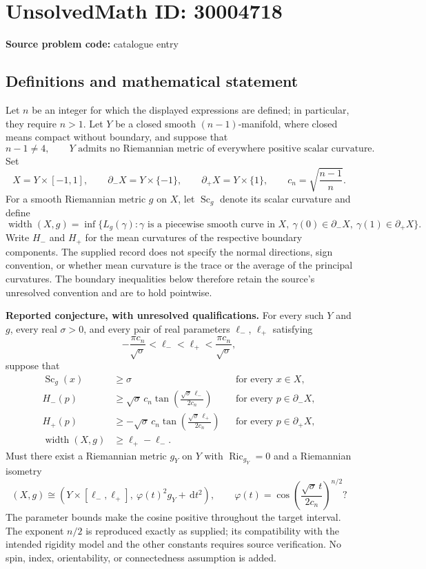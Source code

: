 \documentclass[11pt]{article}
\newcommand{\dd}{\,\mathrm{d}}
\begin{document}
\section*{UnsolvedMath ID: 30004718}
\textbf{Source problem code:} catalogue entry
\subsection{Definitions and mathematical statement}
Let \(n\) be an integer for which the displayed expressions are defined; in particular, they require \(n>1\). Let \(Y\) be a closed smooth \((n-1)\)-manifold, where closed means compact without boundary, and suppose that
\[
n-1\ne 4,
\qquad
Y\text{ admits no Riemannian metric of everywhere positive scalar curvature}.
\]
Set
\[
X=Y\times[-1,1],\qquad
\partial_-X=Y\times\{-1\},\qquad
\partial_+X=Y\times\{1\},\qquad
c_n=\sqrt{\frac{n-1}{n}}.
\]
For a smooth Riemannian metric \(g\) on \(X\), let \(\operatorname{Sc}_g\) denote its scalar curvature and define
\[
\operatorname{width}(X,g)
=\inf\bigl\{L_g(\gamma):\gamma\text{ is a piecewise smooth curve in }X,
\ \gamma(0)\in\partial_-X,\ \gamma(1)\in\partial_+X\bigr\}.
\]
Write \(H_-\) and \(H_+\) for the mean curvatures of the respective boundary components. The supplied record does not specify the normal directions, sign convention, or whether mean curvature is the trace or the average of the principal curvatures. The boundary inequalities below therefore retain the source's unresolved convention and are to hold pointwise.

\textbf{Reported conjecture, with unresolved qualifications.} For every such \(Y\) and \(g\), every real \(\sigma>0\), and every pair of real parameters \(\ell_-\), \(\ell_+\) satisfying
\[
-\frac{\pi c_n}{\sqrt{\sigma}}
<\ell_-<\ell_+
<\frac{\pi c_n}{\sqrt{\sigma}},
\]
suppose that
\[
\begin{aligned}
\operatorname{Sc}_g(x)&\ge\sigma &&\text{for every }x\in X,\\
H_-(p)&\ge\sqrt{\sigma}\,c_n
\tan\!\left(\frac{\sqrt{\sigma}\,\ell_-}{2c_n}\right)
&&\text{for every }p\in\partial_-X,\\
H_+(p)&\ge-\sqrt{\sigma}\,c_n
\tan\!\left(\frac{\sqrt{\sigma}\,\ell_+}{2c_n}\right)
&&\text{for every }p\in\partial_+X,\\
\operatorname{width}(X,g)&\ge\ell_+-\ell_-.
\end{aligned}
\]
Must there exist a Riemannian metric \(g_Y\) on \(Y\) with \(\operatorname{Ric}_{g_Y}=0\) and a Riemannian isometry
\[
(X,g)\cong
\left(Y\times[\ell_-,\ell_+],\ \varphi(t)^2g_Y+\dd t^2\right),
\qquad
\varphi(t)=
\cos\!\left(\frac{\sqrt{\sigma}\,t}{2c_n}\right)^{n/2}?
\]
The parameter bounds make the cosine positive throughout the target interval. The exponent \(n/2\) is reproduced exactly as supplied; its compatibility with the intended rigidity model and the other constants requires source verification. No spin, index, orientability, or connectedness assumption is added.
\end{document}
